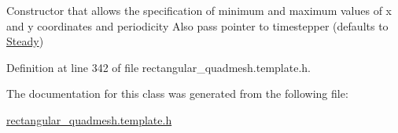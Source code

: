 Constructor that allows the specification of minimum and maximum values of x and y coordinates and periodicity Also pass pointer to timestepper (defaults to \hyperlink{classoomph_1_1Steady}{Steady}) 



Definition at line 342 of file rectangular\+\_\+quadmesh.\+template.\+h.



The documentation for this class was generated from the following file\+:\begin{DoxyCompactItemize}
\item 
\hyperlink{rectangular__quadmesh_8template_8h}{rectangular\+\_\+quadmesh.\+template.\+h}\end{DoxyCompactItemize}
